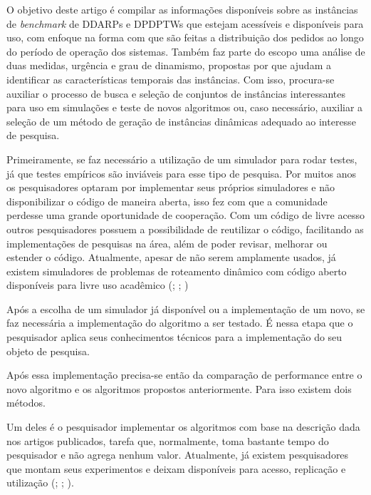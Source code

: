 O objetivo deste artigo é compilar as informações disponíveis sobre as
instâncias de \textit{benchmark} de DDARPs e DPDPTWs que estejam acessíveis e
disponíveis para uso, com enfoque na forma com que são feitas a distribuição
dos pedidos ao longo do período de operação dos sistemas.
Também faz parte do escopo uma análise de duas medidas, urgência e 
grau de dinamismo, propostas por  que ajudam 
a identificar as características temporais das instâncias. 
Com isso, procura-se auxiliar o processo de busca e seleção de conjuntos de 
instâncias interessantes para uso em simulações e teste de novos algoritmos ou,
caso necessário, auxiliar a seleção de um método de geração de instâncias
dinâmicas adequado ao interesse de pesquisa.

\iffalse
Primeiramente, se faz necessário a utilização de um simulador para rodar
testes, já que testes empíricos são inviáveis para esse tipo de pesquisa.
Por muitos anos os pesquisadores optaram por implementar seus próprios 
simuladores e não disponibilizar o código de maneira aberta, isso fez com que a
comunidade perdesse uma grande oportunidade de cooperação.
Com um código de livre acesso outros pesquisadores possuem a possibilidade de
reutilizar o código, facilitando as implementações de pesquisas na área, além
de poder revisar, melhorar ou estender o código. 
Atualmente, apesar de não serem amplamente usados, já existem simuladores de 
problemas de roteamento dinâmico com código aberto disponíveis para livre uso
acadêmico (\cite{van_lon_rinsim:_2012}; \cite{mayer_open-source_2016};
\cite{maciejewski_towards_2017})

Após a escolha de um simulador já disponível ou a implementação de um novo, se
faz necessária a implementação do algoritmo a ser testado. 
É nessa etapa que o pesquisador aplica seus conhecimentos técnicos para a 
implementação do seu objeto de pesquisa.

Após essa implementação precisa-se então da comparação de performance entre
o novo algoritmo e os algoritmos propostos anteriormente.
Para isso existem dois métodos.

Um deles é o pesquisador implementar os algoritmos com base na descrição dada 
nos artigos publicados, tarefa que, normalmente, toma bastante tempo do 
pesquisador e não agrega nenhum valor.
Atualmente, já existem pesquisadores que montam seus experimentos e deixam
disponíveis para acesso, replicação e utilização (\cite{van_lon_towards_2015};
\cite{van_lon_measures_2016}; \cite{van_lon_when_2017}).

